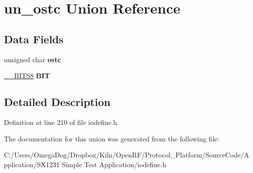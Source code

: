\hypertarget{unionun__ostc}{\section{un\-\_\-ostc Union Reference}
\label{unionun__ostc}
}
\subsection*{Data Fields}
\begin{DoxyCompactItemize}
\item 
\hypertarget{unionun__ostc_a9e564b0c3c17644385f250a491a36b7a}{unsigned char {\bfseries ostc}}\label{unionun__ostc_a9e564b0c3c17644385f250a491a36b7a}

\item 
\hypertarget{unionun__ostc_a4c7a17bb3572c629183544c48f86d360}{\hyperlink{struct_____b_i_t_s8}{\-\_\-\-\_\-\-B\-I\-T\-S8} {\bfseries B\-I\-T}}\label{unionun__ostc_a4c7a17bb3572c629183544c48f86d360}

\end{DoxyCompactItemize}


\subsection{Detailed Description}


Definition at line 210 of file iodefine.\-h.



The documentation for this union was generated from the following file\-:\begin{DoxyCompactItemize}
\item 
C\-:/\-Users/\-Omega\-Dog/\-Dropbox/\-Kiln/\-Open\-R\-F/\-Protocol\-\_\-\-Platform/\-Source\-Code/\-Application/\-S\-X1231 Simple Test Application/iodefine.\-h\end{DoxyCompactItemize}
